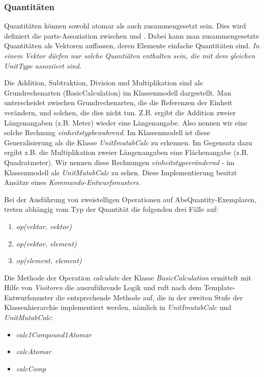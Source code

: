 \subsubsection{Quantitäten}\label{Quantitaeten}


Quantitäten können sowohl atomar als auch zusammengesetzt sein.
Dies wird definiert die parts-Assoziation zwischen  und . 
Dabei kann man zusammengesetzte Quantitäten als Vektoren auffassen, deren Elemente einfache Quantitäten sind. 
\emph{In einem Vektor dürfen nur solche Quantiäten enthalten sein, die mit dem gleichen UnitType assoziiert sind}. 

\label{Berechnungen}

Die Addition, Subtraktion, Division und Multiplikation sind als Grundrechenarten (BasicCalculation) im Klassenmodell dargestellt. Man unterscheidet zwischen Grundrechenarten, die die Referenzen der Einheit verändern, und solchen, die dies nicht tun. Z.B. ergibt die Addition zweier Längenangaben (z.B. Meter) wieder eine Längenangabe. Also nennen wir eine solche Rechnung \emph{einheitstypbewahrend}. Im Klassenmodell ist diese Generalisierung als die Klasse \textit{UnitImutabCalc} zu erkennen. Im Gegensatz dazu ergibt z.B. die Multiplikation zweier Längenangaben eine Flächenangabe (z.B. Quadratmeter). Wir nennen diese Rechnungen \emph{einheitstypverändernd} - im Klassenmodell als \textit{UnitMutabCalc} zu sehen. Diese Implementierung besitzt Ansätze eines \emph{Kommando-Entwurfsmusters}.


Bei der Ausführung von zweistelligen Operationen auf AbsQuantity-Exemplaren, 
treten abhängig vom Typ der Quantität die folgenden drei Fälle auf:
\begin{enumerate}
\item \textit{op(vektor, vektor)}
\item \textit{op(vektor, element)}
\item \textit{op(element, element)}
\end{enumerate}

Die Methode der Operation \textit{calculate} der Klasse \textit{BasicCalculation} ermittelt mit Hilfe von \emph{Visitoren} die auszuführende Logik und ruft nach dem Template-Entwurfsmuster die entsprechende Methode auf, die in der zweiten Stufe der Klassenhierarchie implementiert werden, nämlich in \textit{UnitImutabCalc} und \textit{UnitMutabCalc}:
\begin{itemize}
\item \textit{calc1Compound1Atomar}
\item \textit{calcAtomar}
\item \textit{calcComp}
\end{itemize}

